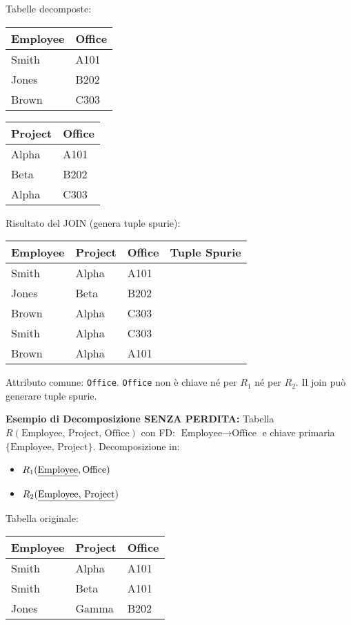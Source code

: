 \noindent Tabelle decomposte:
\begin{center}
\begin{tabular}{|l|l|}
	\hline
	\textbf{Employee} & \textbf{Office} \\ \hline
	Smith & A101 \\ \hline
	Jones & B202 \\ \hline
	Brown & C303 \\ \hline
\end{tabular}
\quad
\begin{tabular}{|l|l|}
	\hline
	\textbf{Project} & \textbf{Office} \\ \hline
	Alpha & A101 \\ \hline
	Beta & B202 \\ \hline
	Alpha & C303 \\ \hline
\end{tabular}
\end{center}

\noindent Risultato del JOIN (genera tuple spurie):
\begin{center}
\begin{tabular}{|l|l|l|c|}
	\hline
	\textbf{Employee} & \textbf{Project} & \textbf{Office} & \textbf{Tuple Spurie} \\ \hline
	Smith & Alpha & A101 & \\ \hline
	Jones & Beta & B202 & \\ \hline
	Brown & Alpha & C303 & \\ \hline
	Smith & Alpha & C303 & \checkmark \\ \hline
	Brown & Alpha & A101 & \checkmark \\ \hline
\end{tabular}
\end{center}

\noindent Attributo comune: \texttt{Office}. \texttt{Office} non è chiave né per $R_1$ né per $R_2$. Il join può generare tuple spurie.

\textbf{Esempio di Decomposizione SENZA PERDITA:}
Tabella $R(\text{Employee, Project, Office})$ con FD: $\text{Employee} \rightarrow \text{Office}$ e chiave primaria $\{\text{Employee, Project}\}$.
Decomposizione in:
\begin{itemize}
	\item $R_1(\text{\underline{Employee}}, \text{Office})$
	\item $R_2(\text{\underline{Employee, Project}})$
\end{itemize}

\noindent Tabella originale:
\begin{center}
\begin{tabular}{|l|l|l|}
	\hline
	\textbf{Employee} & \textbf{Project} & \textbf{Office} \\ \hline
	Smith & Alpha & A101 \\ \hline
	Smith & Beta & A101 \\ \hline
	Jones & Gamma & B202 \\ \hline
\end{tabular}
\end{center}

